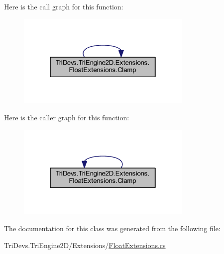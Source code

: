 Here is the call graph for this function\-:
\nopagebreak
\begin{figure}[H]
\begin{center}
\leavevmode
\includegraphics[width=238pt]{class_tri_devs_1_1_tri_engine2_d_1_1_extensions_1_1_float_extensions_a038e638dd531e04d8ac14ecd1a159d0e_cgraph}
\end{center}
\end{figure}




Here is the caller graph for this function\-:
\nopagebreak
\begin{figure}[H]
\begin{center}
\leavevmode
\includegraphics[width=238pt]{class_tri_devs_1_1_tri_engine2_d_1_1_extensions_1_1_float_extensions_a038e638dd531e04d8ac14ecd1a159d0e_icgraph}
\end{center}
\end{figure}




The documentation for this class was generated from the following file\-:\begin{DoxyCompactItemize}
\item 
Tri\-Devs.\-Tri\-Engine2\-D/\-Extensions/\hyperlink{_float_extensions_8cs}{Float\-Extensions.\-cs}\end{DoxyCompactItemize}
